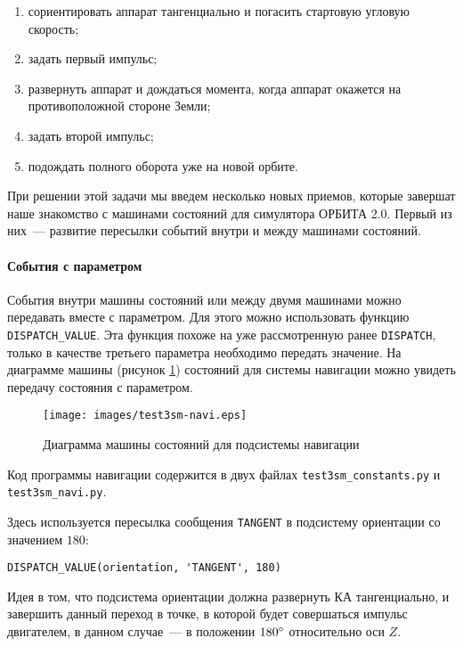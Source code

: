 \documentclass[12pt,a4paper]{article}
\begin{document}
\begin{enumerate}
\item сориентировать аппарат тангенциально и погасить стартовую угловую скорость;
\item задать первый импульс;
\item развернуть аппарат и дождаться момента, когда аппарат окажется на противоположной
  стороне Земли;
\item задать второй импульс;
\item подождать полного оборота уже на новой орбите.
\end{enumerate}

При решении этой задачи мы введем несколько новых приемов, которые завершат наше
знакомство с машинами состояний для симулятора ОРБИТА 2.0. Первый из них~--- развитие
пересылки событий внутри и между машинами состояний.

\paragraph{События с параметром}

События внутри машины состояний или между двумя машинами можно передавать вместе с
параметром. Для этого можно использовать функцию \verb'DISPATCH_VALUE'. Эта функция похоже
на уже рассмотренную ранее \verb'DISPATCH', только в качестве третьего параметра
необходимо передать значение. На диаграмме машины (рисунок \ref{Pic:Test3SM-Navi})
состояний для системы навигации можно увидеть передачу состояния с параметром.

\begin{figure}[tbh]
  \begin{center}
    \texttt{[image: images/test3sm-navi.eps]}
    \caption{Диаграмма машины состояний для подсистемы навигации}
    \label{Pic:Test3SM-Navi}
  \end{center}
\end{figure}

\label{MULTIPLE_MODULES}
Код программы навигации содержится в двух файлах \verb'test3sm_constants.py' и
\verb'test3sm_navi.py'.

Здесь используется пересылка сообщения \verb'TANGENT' в подсистему ориентации со значением
$180$: 

\begin{verbatim}
DISPATCH_VALUE(orientation, 'TANGENT', 180)
\end{verbatim}

Идея в том, что подсистема ориентации должна развернуть КА тангенциально, и завершить
данный переход в точке, в которой будет совершаться импульс двигателем, в данном
случае~--- в положении $180 \degree$ относительно оси $Z$.
\end{document}
